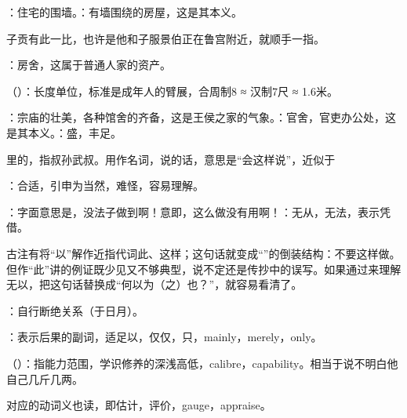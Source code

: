{
\item {}：住宅的围墙。：有墙围绕的房屋，这是其本义。

子贡有此一比，也许是他和子服景伯正在鲁宫附近，就顺手一指。

\item {}：房舍，这属于普通人家的资产。

\item {}（）：长度单位，标准是成年人的臂展，合周制8  ≈ 汉制7尺 ≈ 1.6米。

\item {}：宗庙的壮美，各种馆舍的齐备，这是王侯之家的气象。：官舍，官吏办公处，这是其本义。：盛，丰足。

\item {}里的，指叔孙武叔。用作名词，说的话，意思是“会这样说”，近似于  

\item {}：合适，引申为当然，难怪，容易理解。
}
{}


{
\begin{lyblobitemize}
\item {}：字面意思是，没法子做到啊！意即，这么做没有用啊！：无从，无法，表示凭借。

古注有将“以”解作近指代词此、这样；这句话就变成“”的倒装结构：不要这样做。但作“此”讲的例证既少见又不够典型，说不定还是传抄中的误写。如果通过来理解无以，把这句话替换成“何以为（之）也？”，就容易看清了。

\item {}：自行断绝关系（于日月）。
\item {}：表示后果的副词，适足以，仅仅，只，mainly，merely，only。
\item {}（）：指能力范围，学识修养的深浅高低，calibre，capability。相当于说不明白他自己几斤几两。

对应的动词义也读，即估计，评价，gauge，appraise。
\end{lyblobitemize}
}
{}


